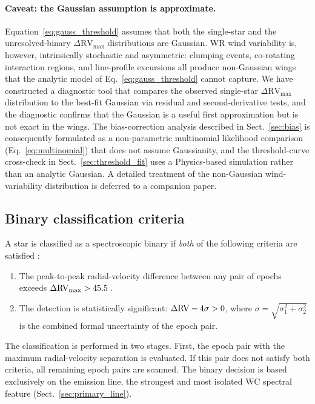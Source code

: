 \paragraph{Caveat: the Gaussian assumption is approximate.}
Equation~\eqref{eq:gauss_threshold} assumes that both the single-star
and the unresolved-binary $\Delta\mathrm{RV}_{\max}$ distributions are
Gaussian. WR wind variability is, however, intrinsically stochastic
and asymmetric: clumping events, co-rotating interaction regions, and
line-profile excursions all produce non-Gaussian wings that the
analytic model of Eq.~\eqref{eq:gauss_threshold} cannot capture. We
have constructed a diagnostic tool that compares the observed
single-star $\Delta\mathrm{RV}_{\max}$ distribution to the best-fit
Gaussian via residual and second-derivative tests, and the diagnostic
confirms that the Gaussian is a useful first approximation but is not
exact in the wings. The bias-correction analysis described in
Sect.~\ref{sec:bias} is consequently formulated as a non-parametric
multinomial likelihood comparison (Eq.~\ref{eq:multinomial}) that does
not assume Gaussianity, and the threshold-curve cross-check in
Sect.~\ref{sec:threshold_fit} uses a Physics-based simulation rather
than an analytic Gaussian. A detailed treatment of the non-Gaussian
wind-variability distribution is deferred to a companion paper.

\subsection{Binary classification criteria}
\label{sec:criteria}

A star is classified as a spectroscopic binary if \emph{both} of the
following criteria are satisfied \citep[following][]{Bartzakos2001,
Dsilva2023}:

\begin{enumerate}
\item The peak-to-peak radial-velocity difference between any pair of
  epochs exceeds $\Delta\mathrm{RV}_\mathrm{max} > 45.5$\,\kms.
\item The detection is statistically significant:
  $\Delta\mathrm{RV} - 4\sigma > 0$, where
  $\sigma = \sqrt{\sigma_1^2 + \sigma_2^2}$ is the combined formal
  uncertainty of the epoch pair.
\end{enumerate}

The classification is performed in two stages. First, the epoch pair with
the maximum radial-velocity separation is evaluated. If this pair does not
satisfy both criteria, all remaining epoch pairs are scanned. The binary
decision is based exclusively on the \primaryline emission line, the
strongest and most isolated WC spectral feature
(Sect.~\ref{sec:primary_line}).

